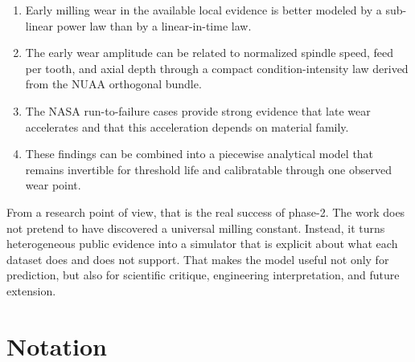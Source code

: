 \documentclass[11pt,a4paper]{article}
\begin{document}
\begin{enumerate}[leftmargin=1.8em]
\item Early milling wear in the available local evidence is better modeled by a sub-linear power law than by a linear-in-time law.
\item The early wear amplitude can be related to normalized spindle speed, feed per tooth, and axial depth through a compact condition-intensity law derived from the NUAA orthogonal bundle.
\item The NASA run-to-failure cases provide strong evidence that late wear accelerates and that this acceleration depends on material family.
\item These findings can be combined into a piecewise analytical model that remains invertible for threshold life and calibratable through one observed wear point.
\end{enumerate}

From a research point of view, that is the real success of phase-2. The work does not pretend to have discovered a universal
milling constant. Instead, it turns heterogeneous public evidence into a simulator that is explicit about what each dataset
does and does not support. That makes the model useful not only for prediction, but also for scientific critique, engineering
interpretation, and future extension.

\appendix

\section{Notation}
\end{document}
